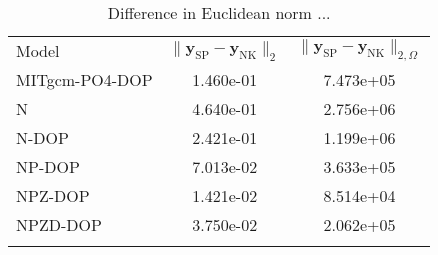 
\begin{table*}
\setlength{\tabcolsep}{10pt}
\caption{\label{tab:norms}
Difference in Euclidean norm ...}
\vspace{0.3cm}
\small
\centering
\begin{tabular}{l S S}
\tophline
Model			&	{$\| \mathbf{y}_{\mathrm{SP}} - \mathbf{y}_{\mathrm{NK}} \|_2$}	& 	{$\| \mathbf{y}_{\mathrm{SP}} - \mathbf{y}_{\mathrm{NK}} \|_{2, \Omega}$}	\\
\middlehline
MITgcm-PO4-DOP  &  1.460e-01  &  7.473e+05  \\
N               &  4.640e-01  &  2.756e+06  \\
N-DOP           &  2.421e-01  &  1.199e+06  \\
NP-DOP          &  7.013e-02  &  3.633e+05  \\
NPZ-DOP         &  1.421e-02  &  8.514e+04  \\
NPZD-DOP        &  3.750e-02  &  2.062e+05  \\
\bottomhline
\end{tabular}
\end{table*}

